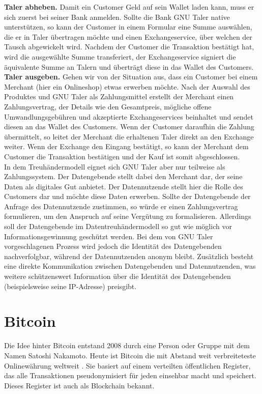 \documentclass[
	fontsize=12pt,
	headings=small,
	parskip=half,           %
	bibliography=totoc,
	numbers=noenddot,       %
	open=any,               %
]{scrreprt}
\begin{document}
\textbf{Taler abheben.} Damit ein Customer Geld auf sein Wallet laden kann, muss er sich zuerst bei seiner Bank anmelden. Sollte die Bank GNU Taler native unterstützen, so kann der Customer in einem Formular eine Summe auswählen, die er in Taler übertragen möchte und einen Exchangeservice, über welchen der Tausch abgewickelt wird. Nachdem der Customer die Transaktion bestätigt hat, wird die ausgewählte Summe transferiert, der Exchangeservice signiert die äquivalente Summe an Talern und überträgt diese in das Wallet des Customers.\\

\textbf{Taler ausgeben.} Gehen wir von der Situation aus, dass ein Customer bei einem Merchant (hier ein Onlineshop) etwas erwerben möchte. Nach der Auswahl des Produktes und GNU Taler als Zahlungsmittel erstellt der Merchant einen Zahlungsvertrag, der Details wie den Gesamtpreis, mögliche offene Umwandlungsgebühren und akzeptierte Exchangeservices beinhaltet und sendet diesen an das Wallet des Customers.  Wenn der Customer daraufhin die Zahlung übermittelt, so leitet der Merchant die erhaltenen Taler direkt an den Exchange weiter. Wenn der Exchange den Eingang bestätigt, so kann der Merchant dem Customer die Transaktion bestätigen und der Kauf ist somit abgeschlossen.\\


In dem Treuhändermodell eignet sich GNU Taler aber nur teilweise als Zahlungssystem. Der Datengebende stellt dabei den Merchant dar, der seine Daten als digitales Gut anbietet. Der Datennutzende stellt hier die Rolle des Customers dar und möchte diese Daten erwerben. Sollte der Datengebende der Anfrage des Datennutzende zustimmen, so würde er einen Zahlungsvertrag formulieren, um den Anspruch auf seine Vergütung zu formalisieren. Allerdings soll der Datengebende im Datentreuhändermodell so gut wie möglich vor Informationsgewinnung geschützt werden. Bei dem von GNU Taler vorgeschlagenen Prozess wird jedoch die Identität des Datengebenden nachverfolgbar, während der Datennutzenden anonym bleibt. Zusätzlich besteht eine direkte Kommunikation zwischen Datengebenden und Datennutzenden, was weitere schützenswert Information über die Identität des Datengebenden (beispielsweise seine IP-Adresse) preisgibt.

\section{Bitcoin}
\label{sec:bitcoin}
Die Idee hinter Bitcoin entstand 2008 durch eine Person oder Gruppe mit dem Namen Satoshi Nakamoto. Heute ist Bitcoin die mit Abstand weit verbreiteteste Onlinewährung weltweit \cite{btc-beginnerGuide}. Sie basiert auf einem verteilten öffentlichen Register, das alle Transaktionen pseudonymisiert für jeden einsehbar macht und speichert. Dieses Register ist auch als Blockchain bekannt.
\end{document}
